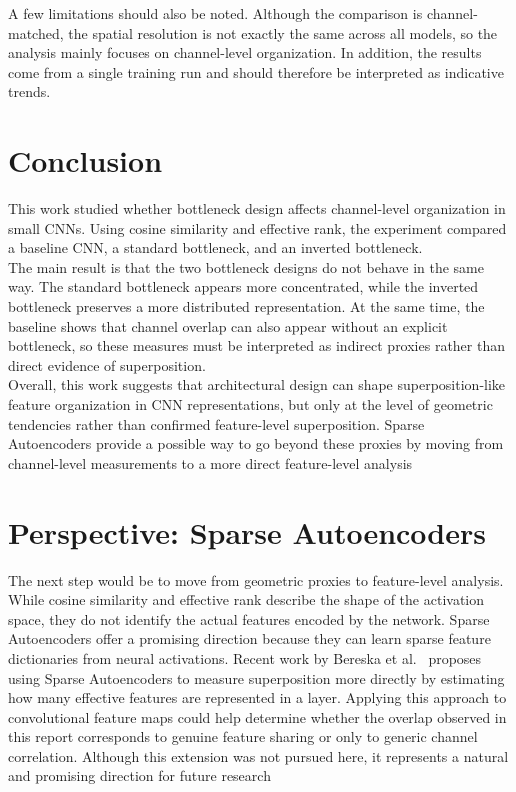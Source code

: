 \documentclass[12pt,a4paper]{report}
\begin{document}
A few limitations should also be noted. Although the comparison is channel-matched, the spatial resolution is not exactly the same across all models, so the analysis mainly focuses on channel-level organization. In addition, the results come from a single training run and should therefore be interpreted as indicative trends.

\section{Conclusion}
This work studied whether bottleneck design affects channel-level organization in small CNNs. Using cosine similarity and effective rank, the experiment compared a baseline CNN, a standard bottleneck, and an inverted bottleneck.\\

The main result is that the two bottleneck designs do not behave in the same way. The standard bottleneck appears more concentrated, while the inverted bottleneck preserves a more distributed representation. At the same time, the baseline shows that channel overlap can also appear without an explicit bottleneck, so these measures must be interpreted as indirect proxies rather than direct evidence of superposition.\\

Overall, this work suggests that architectural design can shape superposition-like feature organization in CNN representations, but only at the level of geometric tendencies rather than confirmed feature-level superposition. Sparse Autoencoders provide a possible way to go beyond these proxies by moving from channel-level measurements to a more direct feature-level analysis

\section{Perspective: Sparse Autoencoders}

The next step would be to move from geometric proxies to feature-level analysis. While cosine similarity and effective rank describe the shape of the activation space, they do not identify the actual features encoded by the network. Sparse Autoencoders offer a promising direction because they can learn sparse feature dictionaries from neural activations. 
Recent work by Bereska et al.~\cite{bereska2025} proposes using Sparse Autoencoders to measure superposition more directly by estimating how many effective features are represented in a layer. Applying this approach to convolutional feature maps could help determine whether the overlap observed in this report corresponds to genuine feature sharing or only to generic channel correlation. Although this extension was not pursued here, it represents a natural and promising direction for future research
\clearpage
\end{document}
